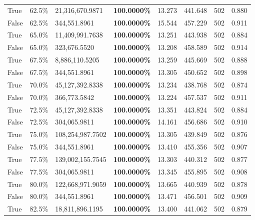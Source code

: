 \begin{table}[H]
\begin{tabular}{lllrllll}
\cline{1-8}
True & 62.5\% & 21,316,670.9871 & \bfseries \color{red} 100.0000\% & 13.273 & 441.648 & 502 & 0.880 \\
\cline{1-8}
False & 62.5\% & 344,551.8961 & \bfseries \color{red} 100.0000\% & 15.544 & 457.229 & 502 & 0.911 \\
\cline{1-8}
True & 65.0\% & 11,409,991.7638 & \bfseries \color{red} 100.0000\% & 13.251 & 443.938 & 502 & 0.884 \\
\cline{1-8}
False & 65.0\% & 323,676.5520 & \bfseries \color{red} 100.0000\% & 13.208 & 458.589 & 502 & 0.914 \\
\cline{1-8}
True & 67.5\% & 8,886,110.5205 & \bfseries \color{red} 100.0000\% & 13.259 & 445.669 & 502 & 0.888 \\
\cline{1-8}
False & 67.5\% & 344,551.8961 & \bfseries \color{red} 100.0000\% & 13.305 & 450.652 & 502 & 0.898 \\
\cline{1-8}
True & 70.0\% & 45,127,392.8338 & \bfseries \color{red} 100.0000\% & 13.234 & 438.768 & 502 & 0.874 \\
\cline{1-8}
False & 70.0\% & 366,773.5842 & \bfseries \color{red} 100.0000\% & 13.224 & 457.537 & 502 & 0.911 \\
\cline{1-8}
True & 72.5\% & 45,127,392.8338 & \bfseries \color{red} 100.0000\% & 13.351 & 443.824 & 502 & 0.884 \\
\cline{1-8}
False & 72.5\% & 304,065.9811 & \bfseries \color{red} 100.0000\% & 14.161 & 456.686 & 502 & 0.910 \\
\cline{1-8}
True & 75.0\% & 108,254,987.7502 & \bfseries \color{red} 100.0000\% & 13.305 & 439.849 & 502 & 0.876 \\
\cline{1-8}
False & 75.0\% & 344,551.8961 & \bfseries \color{red} 100.0000\% & 13.410 & 455.356 & 502 & 0.907 \\
\cline{1-8}
True & 77.5\% & 139,002,155.7545 & \bfseries \color{red} 100.0000\% & 13.303 & 440.312 & 502 & 0.877 \\
\cline{1-8}
False & 77.5\% & 304,065.9811 & \bfseries \color{red} 100.0000\% & 13.345 & 455.895 & 502 & 0.908 \\
\cline{1-8}
True & 80.0\% & 122,668,971.9059 & \bfseries \color{red} 100.0000\% & 13.665 & 440.939 & 502 & 0.878 \\
\cline{1-8}
False & 80.0\% & 344,551.8961 & \bfseries \color{red} 100.0000\% & 13.471 & 456.501 & 502 & 0.909 \\
\cline{1-8}
True & 82.5\% & 18,811,896.1195 & \bfseries \color{red} 100.0000\% & 13.400 & 441.062 & 502 & 0.879 \\

\end{tabular}
\end{table}
